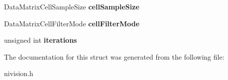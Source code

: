 \begin{DoxyCompactItemize}
\item 
\hypertarget{structDataMatrixReport__struct_af7015c5127508209e89a143bca731438}{\-Data\-Matrix\-Cell\-Sample\-Size {\bfseries cell\-Sample\-Size}}\label{structDataMatrixReport__struct_af7015c5127508209e89a143bca731438}

\item 
\hypertarget{structDataMatrixReport__struct_a4cc3d30116ba9a020c5a87d8f02ecf53}{\-Data\-Matrix\-Cell\-Filter\-Mode {\bfseries cell\-Filter\-Mode}}\label{structDataMatrixReport__struct_a4cc3d30116ba9a020c5a87d8f02ecf53}

\item 
\hypertarget{structDataMatrixReport__struct_ad21255de7dd17438b9148bddadf95059}{unsigned int {\bfseries iterations}}\label{structDataMatrixReport__struct_ad21255de7dd17438b9148bddadf95059}

\end{DoxyCompactItemize}


\-The documentation for this struct was generated from the following file\-:\begin{DoxyCompactItemize}
\item 
nivision.\-h\end{DoxyCompactItemize}

